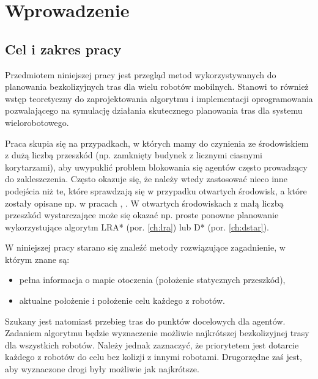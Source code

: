 \chapter{Wprowadzenie}
\label{ch:wprowadzenie}

\section{Cel i zakres pracy}
Przedmiotem niniejszej pracy jest przegląd metod wykorzystywanych do planowania bezkolizyjnych tras dla wielu robotów mobilnych.
Stanowi to również wstęp teoretyczny do zaprojektowania algorytmu i implementacji oprogramowania pozwalającego na symulację działania skutecznego planowania tras dla systemu wielorobotowego.

Praca skupia się na przypadkach, w których mamy do czynienia ze środowiskiem z dużą liczbą przeszkód (np. zamknięty budynek z licznymi ciasnymi korytarzami), aby uwypuklić problem blokowania się agentów często prowadzący do zakleszczenia. Często okazuje się, że należy wtedy zastosować nieco inne podejścia niż te, które sprawdzają się w przypadku otwartych środowisk, a które zostały opisane np. w pracach \cite{roszkowska}, \cite{siemiatkowska}.
W otwartych środowiskach z małą liczbą przeszkód wystarczające może się okazać np. proste ponowne planowanie wykorzystujące algorytm LRA* (por. \ref{ch:lra}) lub D* (por. \ref{ch:dstar}).

W niniejszej pracy starano się znaleźć metody rozwiązujące zagadnienie, w którym znane są:
\vspace{-1em}
\begin{itemize}[noitemsep]
	\item pełna informacja o mapie otoczenia (położenie statycznych przeszkód),
	\item aktualne położenie i położenie celu każdego z robotów.
\end{itemize}
Szukany jest natomiast przebieg tras do punktów docelowych dla agentów. Zadaniem algorytmu będzie wyznaczenie możliwie najkrótszej bezkolizyjnej trasy dla wszystkich robotów. Należy jednak zaznaczyć, że priorytetem jest dotarcie każdego z robotów do celu bez kolizji z innymi robotami. Drugorzędne zaś jest, aby wyznaczone drogi były możliwie jak najkrótsze.

\clearpage
